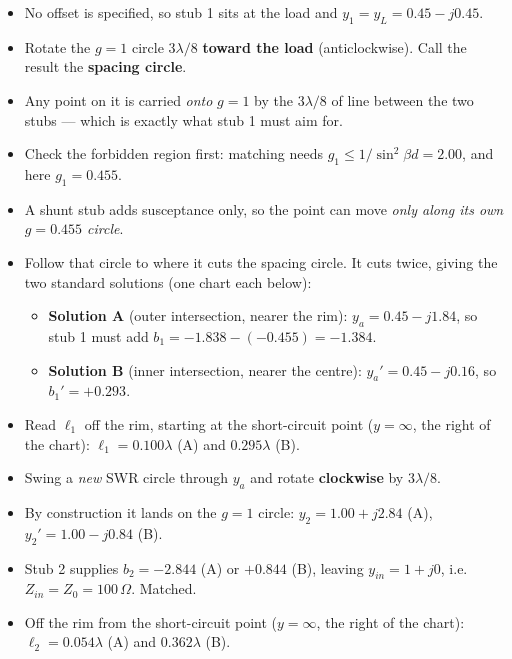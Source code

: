 \begin{itemize}
  \item No offset is specified, so stub 1 sits at the load and $y_1 = y_L = 0.45 - j0.45$.
\end{itemize}
\begin{itemize}
  \item Rotate the $g=1$ circle $3\lambda/8$ \textbf{toward the load} (anticlockwise). Call the result the \textbf{spacing circle}.
  \item Any point on it is carried \emph{onto} $g=1$ by the $3\lambda/8$ of line between the two stubs --- which is exactly what stub 1 must aim for.
  \item Check the forbidden region first: matching needs $g_1 \le 1/\sin^2\beta d = 2.00$, and here $g_1 = 0.455$. \checkmark
\end{itemize}
\begin{itemize}
  \item A shunt stub adds susceptance only, so the point can move \emph{only along its own $g = 0.455$ circle}.
  \item Follow that circle to where it cuts the spacing circle. It cuts twice, giving the two standard solutions (one chart each below):
  \begin{itemize}
    \item \textbf{Solution A} (outer intersection, nearer the rim): $y_a = 0.45 - j1.84$, so stub 1 must add $b_1 = -1.838 - (-0.455) = -1.384$.
    \item \textbf{Solution B} (inner intersection, nearer the centre): $y_a' = 0.45 - j0.16$, so $b_1' = +0.293$.
  \end{itemize}
  \item Read $\ell_1$ off the rim, starting at the short-circuit point ($y=\infty$, the right of the chart): $\ell_1 = 0.100\lambda$ (A) and $0.295\lambda$ (B).
\end{itemize}
\begin{itemize}
  \item Swing a \emph{new} SWR circle through $y_a$ and rotate \textbf{clockwise} by $3\lambda/8$.
  \item By construction it lands on the $g=1$ circle: $y_2 = 1.00 + j2.84$ (A), $y_2' = 1.00 - j0.84$ (B).
\end{itemize}
\begin{itemize}
  \item Stub 2 supplies $b_2 = -2.844$ (A) or $+0.844$ (B), leaving $y_{in} = 1 + j0$, i.e. $Z_{in} = Z_0 = 100\,\Omega$. Matched.
  \item Off the rim from the short-circuit point ($y=\infty$, the right of the chart): $\ell_2 = 0.054\lambda$ (A) and $0.362\lambda$ (B).
\end{itemize}
